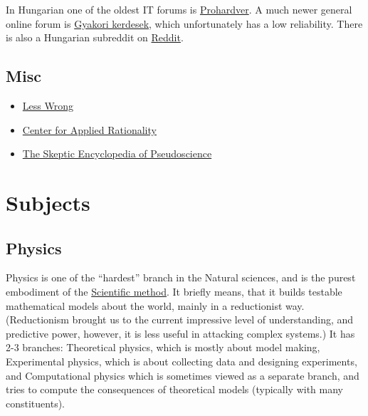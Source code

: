 \documentclass{article}
\begin{document}
In Hungarian one of the oldest IT forums is \href{https://prohardver.hu/forum/index.html}{Prohardver}. A much newer general online forum is \href{https://www.gyakorikerdesek.hu/}{Gyakori kerdesek}, which unfortunately has a low reliability.
There is also a Hungarian subreddit on \href{https://www.reddit.com/r/hungary/}{Reddit}.

\subsection{Misc}

\begin{itemize}
    \item \href{https://www.lesswrong.com/}{Less Wrong}
    \item \href{https://rationality.org/}{Center for Applied Rationality}
    \item \href{https://www.goodreads.com/book/show/656073.The_Skeptic_Encyclopedia_of_Pseudoscience}{The Skeptic Encyclopedia of Pseudoscience}
\end{itemize}

\section{Subjects}

\subsection{Physics}

Physics is one of the ``hardest'' branch in the Natural sciences, and is the purest embodiment of the \href{https://plato.stanford.edu/entries/scientific-method/}{Scientific method}.
It briefly means, that it builds testable mathematical models about the world, mainly in a reductionist way. (Reductionism brought us to the current impressive level of understanding, and predictive power, however, it is less useful in attacking complex systems.)
It has 2-3 branches: Theoretical physics, which is mostly about model making, Experimental physics, which is about collecting data and designing experiments, and Computational physics which is sometimes viewed as a separate branch, and tries to compute the consequences of theoretical models (typically with many constituents).
\end{document}
